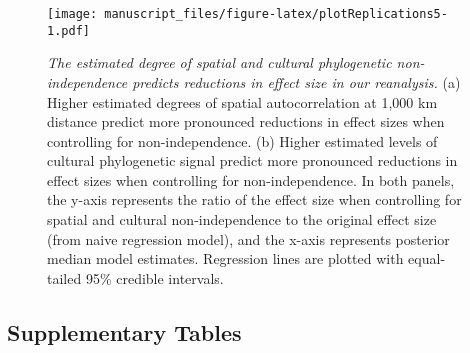 \documentclass[
  man,floatsintext]{apa6}
\begin{document}
\newpage



\begin{figure}
\centering
\texttt{[image: manuscript\_files/figure-latex/plotReplications5-1.pdf]}
\caption{\label{fig:plotReplications5}\emph{The estimated degree of spatial and cultural phylogenetic non-independence predicts reductions in effect size in our reanalysis.} (a) Higher estimated degrees of spatial autocorrelation at 1,000 km distance predict more pronounced reductions in effect sizes when controlling for non-independence. (b) Higher estimated levels of cultural phylogenetic signal predict more pronounced reductions in effect sizes when controlling for non-independence. In both panels, the y-axis represents the ratio of the effect size when controlling for spatial and cultural non-independence to the original effect size (from naive regression model), and the x-axis represents posterior median model estimates. Regression lines are plotted with equal-tailed 95\% credible intervals.}
\end{figure}

\newpage

\hypertarget{supplementary-tables}{%
\subsection{Supplementary Tables}\label{supplementary-tables}}
\end{document}
